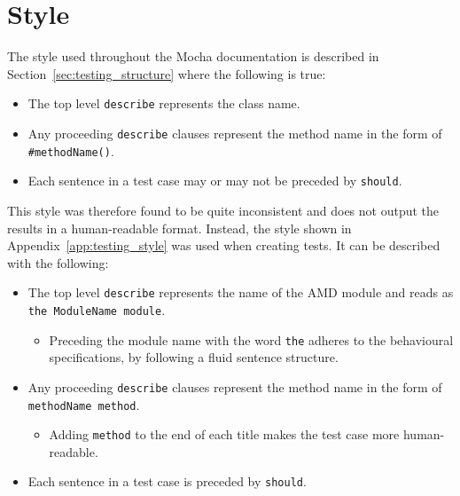 \section{Style} {
\label{sec:testing_style}

	The style used throughout the Mocha documentation is described in Section~\ref{sec:testing_structure} where the following is true:

	\begin{itemize}
		\item The top level \texttt{describe} represents the class name.
		\item Any proceeding \texttt{describe} clauses represent the method name in the form of \texttt{\#methodName()}.
		\item Each sentence in a test case may or may not be preceded by \texttt{should}.
	\end{itemize}

	This style was therefore found to be quite inconsistent and does not output the results in a human-readable format. Instead, the style shown in Appendix~\ref{app:testing_style} was used when creating tests. It can be described with the following:

	\begin{itemize}
		\item The top level \texttt{describe} represents the name of the AMD module and reads as \texttt{the ModuleName module}.
			\begin{itemize}
				\item Preceding the module name with the word \texttt{the} adheres to the behavioural specifications, by following a fluid sentence structure.
			\end{itemize}
		\item Any proceeding \texttt{describe} clauses represent the method name in the form of \texttt{methodName method}.
			\begin{itemize}
				\item Adding \texttt{method} to the end of each title makes the test case more human-readable.
			\end{itemize}
		\item Each sentence in a test case is preceded by \texttt{should}.
	\end{itemize}

}


